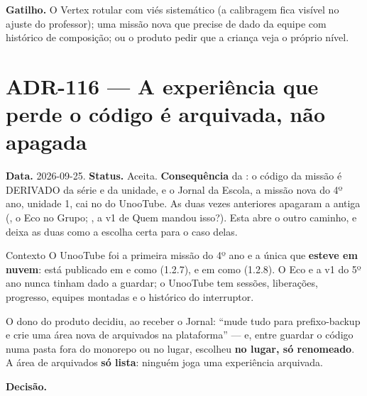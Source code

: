 \textbf{Gatilho.} O Vertex rotular com viés sistemático (a calibragem fica
visível no ajuste do professor); uma missão nova que precise de dado da equipe
com histórico de composição; ou o produto pedir que a criança veja o próprio
nível.

\section{ADR-116 --- A experiência que perde o código é arquivada, não apagada}
\label{adr:arquivar-em-vez-de-apagar}

\textbf{Data.} 2026-09-25. \textbf{Status.} Aceita.
\textbf{Consequência} da : o código da missão é DERIVADO da série e
da unidade, e o Jornal da Escola, a missão nova do 4º ano, unidade 1, cai no
 do UnooTube. As duas vezes anteriores apagaram a antiga
(, o Eco no Grupo; , a v1 de Quem mandou isso?).
Esta abre o outro caminho, e deixa as duas como a escolha certa para o caso
delas.

\begin{especificacao}{Contexto}
O UnooTube foi a primeira missão do 4º ano e a única que \textbf{esteve em
nuvem}: está publicado em  e  como  (1.2.7),
e em  como  (1.2.8). O Eco e a v1 do 5º ano nunca
tinham dado a guardar; o UnooTube tem sessões, liberações, progresso, equipes
montadas e o histórico do interruptor.

O dono do produto decidiu, ao receber o Jornal: \enquote{mude tudo para
prefixo-backup e crie uma área nova de arquivados na plataforma} --- e, entre
guardar o código numa pasta fora do monorepo ou no lugar, escolheu \textbf{no
lugar, só renomeado}. A área de arquivados \textbf{só lista}: ninguém joga uma
experiência arquivada.
\end{especificacao}

\textbf{Decisão.}

